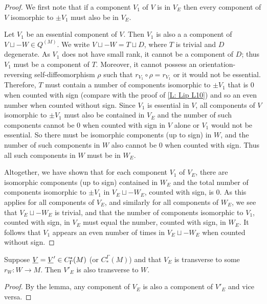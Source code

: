 \begin{proof}
	We first note that if a component $V_1$ of $V$ is in $V_E$ then every component of $V$ isomorphic to $\pm V_1$ must also be in $V_E$.

	Let $V_1$ be an essential component of $V$.
	Then $V_1$ is also a a component of $V \sqcup -W \in Q^(M)$.
	We write $V \sqcup -W = T \sqcup D$, where $T$ is trivial and $D$ degenerate.
	As $V_1$ does not have small rank, it cannot be a component of $D$; thus $V_1$ must be a component of $T$.
	Moreover, it cannot possess an orientation-reversing self-diffeomorphism $\rho$ such that $r_{V_1} \circ \rho = r_{V_1}$ or it would not be essential.
	Therefore, $T$
	must contain a number of components isomorphic to $\pm V_1$ that is $0$ when counted with sign (compare with the proof of \cref{L: Lip L10})
	and so an even number when counted without sign.
	Since $V_1$ is essential in $V$, all components of $V$ isomorphic to $\pm V_1$ must also be contained in $V_E$ and
	the number of such components cannot be $0$ when counted with sign in $V$ alone or $V_1$ would not be essential.
	So there must be isomorphic components (up to sign) in $W$, and the number of such components in $W$ also cannot be $0$ when counted
	with sign.
	Thus all such components in $W$ must be in $W_E$.

	Altogether, we have shown that for each component $V_1$ of $V_E$, there are isomorphic components (up to sign) contained in $W_E$
	and the total number of components isomorphic to $\pm V_1$ in $V_E\sqcup-W_E$, counted with sign, is $0$.
	As this applies for all components of $V_E$, and similarly for all components of $W_E$, we see that $V_E \sqcup -W_E$ is trivial, and that the number of
	components isomorphic to $V_1$, counted with sign, in $V_E$ must equal the number, counted with sign, in $W_E$.
	It follows that $V_1$ appears an
	even number of times in $V_E\sqcup-W_E$ when counted without sign.
\end{proof}

\begin{corollary}\label{C: essential trans}
	Suppose $\underline{V} = \underline{V}' \in C^*_\Gamma(M)$ (or $C_*^\Gamma(M)$) and that $V_E$ is transverse to some $r_W \colon W \to M$.
	Then $V'_E$ is also transverse to $W$.
\end{corollary}

\begin{proof}
	By the lemma, any component of $V_E$ is also a component of $V'_E$ and vice versa.
\end{proof}

